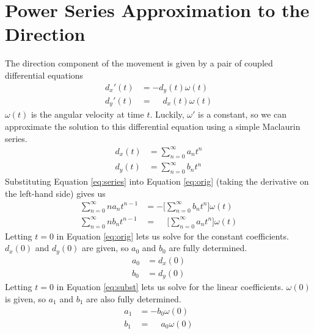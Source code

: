 \documentclass{report}
\begin{document}
\section{Power Series Approximation to the Direction}
The direction component of the movement is given by a pair of
coupled differential equations
\begin{equation} \label{eq:orig}
    \begin{aligned}
    d_x'(t) &= -d_y(t)\omega(t)\\
    d_y'(t) &= \phantom{-}d_x(t)\omega(t)
    \end{aligned}
\end{equation}
$\omega(t)$ is the angular velocity at time $t$. Luckily,
$\omega'$ is a constant, so we can approximate
the solution to this differential equation using a simple Maclaurin series.
\begin{equation} \label{eq:series}
    \begin{aligned}
    d_x(t) &= \sum_{n=0}^\infty a_n t^n \\
    d_y(t) &= \sum_{n=0}^\infty b_n t^n
    \end{aligned}
\end{equation}
Substituting Equation \ref{eq:series} into Equation \ref{eq:orig}
(taking the derivative on the left-hand side) gives us
\begin{equation} \label{eq:subst}
    \begin{aligned}
    \sum_{n=0}^\infty n a_n t^{n-1} &=
        -\Bigg[\sum_{n=0}^\infty b_n t^n \Bigg]
        \omega(t) \\
    \sum_{n=0}^\infty n b_n t^{n-1} &=
        \phantom{-}\Bigg[\sum_{n=0}^\infty a_n t^n \Bigg]
        \omega(t)
    \end{aligned}
\end{equation}
Letting $t=0$ in Equation \ref{eq:orig} lets us solve for the constant coefficients. $d_x(0)$ and $d_y(0)$ are given,
so $a_0$ and $b_0$ are fully determined.
\begin{equation} \label{eq:coeff0}
    \begin{aligned}
        a_0 &= d_x(0) \\
        b_0 &= d_y(0)
    \end{aligned}
\end{equation}
Letting $t=0$ in
Equation \ref{eq:subst} lets us solve for the linear coefficients. $\omega(0)$ is given, so $a_1$ and $b_1$ are also
fully determined.
\begin{equation} \label{eq:coeff1}
    \begin{aligned}
    a_1 &= -b_0\omega(0) \\
    b_1 &= \phantom{-}a_0\omega(0)
    \end{aligned}
\end{equation}
\end{document}
